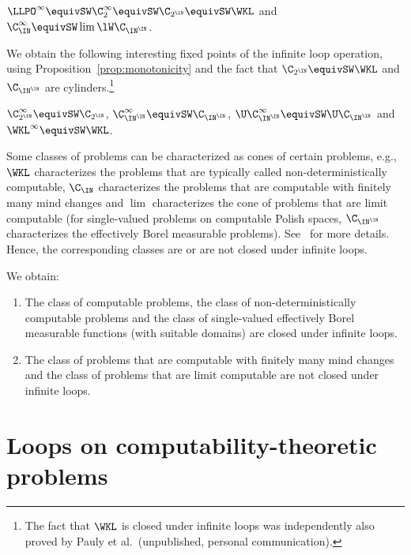 \begin{cor}
$\LLPO^\infty\equivSW\C_2^\infty\equivSW\C_{2^\IN}\equivSW\WKL$ and $\C_\IN^\infty\equivSW\lim\lW\C_{\IN^\IN}$.
\end{cor}

\noindent
We obtain the following interesting fixed points of the infinite loop operation, 
using Proposition~\ref{prop:monotonicity} and the fact
that $\C_{2^\IN}\equivSW\WKL$ and $\C_{\IN^\IN}$ are cylinders.\footnote{The fact that $\WKL$ 
is closed under infinite loops was independently also proved by Pauly et al.\ (unpublished, personal communication).}

\begin{cor}
$\C_{2^\IN}^\infty\equivSW\C_{2^\IN}$, $\C_{\IN^\IN}^\infty\equivSW\C_{\IN^\IN}$, $\U\C_{\IN^\IN}^\infty\equivSW\U\C_{\IN^\IN}$ and $\WKL^\infty\equivSW\WKL$.
\end{cor}

\noindent
Some classes of problems can be characterized as cones of certain problems, e.g., $\WKL$ characterizes
the problems that are typically called non-deterministically computable, $\C_\IN$ characterizes the problems
that are computable with finitely many mind changes and $\lim$ characterizes the cone of problems
that are limit computable (for single-valued problems on computable Polish spaces, $\C_{\IN^\IN}$ characterizes
the effectively Borel measurable problems). See~\cite{BBP12} for more details.
Hence, the corresponding classes are or are not closed under infinite loops.

\begin{cor}
We obtain:
\begin{enumerate} 
\item The class of computable problems, the class of non-deterministically computable problems
and the class of single-valued effectively Borel measurable functions (with suitable domains) are closed
under infinite loops.
\item The class of problems that are computable with finitely many mind changes and the class
of problems that are limit computable are not closed under infinite loops.
\end{enumerate}
\end{cor}


\section{Loops on computability-theoretic problems}
\label{sec:NON}

